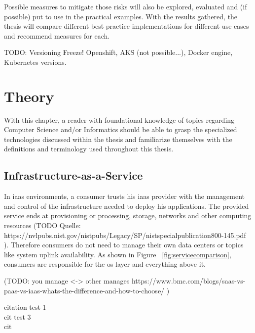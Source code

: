 Possible measures to mitigate those risks will also be explored, evaluated and (if possible) put to use in the practical examples. 
With the results gathered, the thesis will compare different best practice implementations for different use cases and recommend measures for each.


TODO: Versioning Freeze! Openshift, AKS (not possible...), Docker engine, Kubernetes versions.

\chapter{Theory}
With this chapter, a reader with foundational knowledge of topics regarding Computer Science and/or Informatics should be able to grasp the specialized technologies discussed within the thesis and familiarize themselves with the definitions and terminology used throughout this thesis.

\section{Infrastructure-as-a-Service}
In \gls{iaas} environments, a consumer trusts his \gls{iaas} provider with the management and control of the infrastructure needed to deploy his applications.
The provided service ends at provisioning or processing, storage, networks and other computing resources \cite{nistcloud}
(TODO Quelle: https://nvlpubs.nist.gov/nistpubs/Legacy/SP/nistspecialpublication800-145.pdf ). 
Therefore consumers do not need to manage their own data centers or topics like system uplink availability.
As shown in Figure ~\ref{fig:servicecomparison}, consumers are responsible for the \gls{os} layer and everything above it.

(TODO: you manage <-> other manages https://www.bmc.com/blogs/saas-vs-paas-vs-iaas-whats-the-difference-and-how-to-choose/ )

citation test 1\cite{servicecomparison} \\
cit test 3~\cite{servicecomparison} \\
cit 


